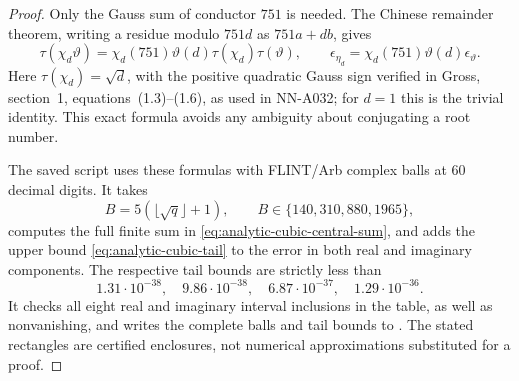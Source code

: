 \begin{proof}
Only the Gauss sum of conductor $751$ is needed. The Chinese remainder
theorem, writing a residue modulo $751d$ as $751a+db$, gives
\[
 \tau(\chi_d\vartheta)
   =\chi_d(751)\vartheta(d)\tau(\chi_d)\tau(\vartheta),
 \qquad
 \epsilon_{\eta_d}
   =\chi_d(751)\vartheta(d)\epsilon_\vartheta.
\]
Here $\tau(\chi_d)=\sqrt d$, with the positive quadratic Gauss
sign verified in Gross, section~1, equations~(1.3)--(1.6),
as used in NN-A032; for $d=1$ this is the trivial identity.
This exact formula avoids any ambiguity about conjugating a
root number.

The saved script 
uses these formulas with FLINT/Arb complex balls at $60$
decimal digits. It takes
\[
 B=5(\lfloor\sqrt q\rfloor+1),\qquad
 B\in\{140,310,880,1965\},
\]
computes the full finite sum in
\eqref{eq:analytic-cubic-central-sum}, and adds the upper bound
\eqref{eq:analytic-cubic-tail} to the error in both real and
imaginary components. The respective tail bounds are strictly
less than
\[
 1.31\cdot10^{-38},\quad9.86\cdot10^{-38},\quad
 6.87\cdot10^{-37},\quad1.29\cdot10^{-36}.
\]
It checks all eight real and imaginary interval inclusions in
the table, as well as nonvanishing, and writes the complete
balls and tail bounds to
.
The stated rectangles are certified enclosures, not numerical
approximations substituted for a proof.
\end{proof}

